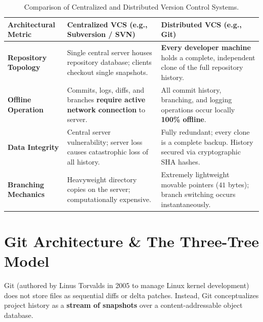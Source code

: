 \begin{table}[htbp]
\centering
\small
\begin{tabularx}{\linewidth}{l X X}
\toprule
\textbf{Architectural Metric} & \textbf{Centralized VCS (e.g., Subversion / SVN)} & \textbf{Distributed VCS (e.g., Git)} \\
\midrule
\textbf{Repository Topology} & Single central server houses repository database; clients checkout single snapshots. & \textbf{Every developer machine} holds a complete, independent clone of the full repository history. \\
\textbf{Offline Operation} & Commits, logs, diffs, and branches \textbf{require active network connection} to server. & All commit history, branching, and logging operations occur locally \textbf{100\% offline}. \\
\textbf{Data Integrity} & Central server vulnerability; server loss causes catastrophic loss of all history. & Fully redundant; every clone is a complete backup. History secured via cryptographic SHA hashes. \\
\textbf{Branching Mechanics} & Heavyweight directory copies on the server; computationally expensive. & Extremely lightweight movable pointers ($41$ bytes); branch switching occurs instantaneously. \\
\bottomrule
\end{tabularx}
\caption{Comparison of Centralized and Distributed Version Control Systems.}
\label{tab:cvcs-dvcs}
\end{table}

\section{Git Architecture \& The Three-Tree Model}
Git (authored by Linus Torvalds in 2005 to manage Linux kernel development) does not store files as sequential diffs or delta patches. Instead, Git conceptualizes project history as a \textbf{stream of snapshots} over a content-addressable object database.

